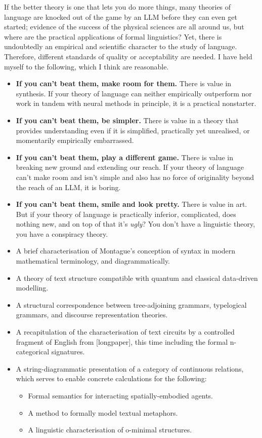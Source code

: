 If the better theory is one that lets you do more things, many theories of language are knocked out of the game by an LLM before they can even get started; evidence of the success of the physical sciences are all around us, but where are the practical applications of formal linguistics? Yet, there is undoubtedly an empirical and scientific character to the study of language. Therefore, different standards of quality or acceptability are needed. I have held myself to the following, which I think are reasonable.

\begin{itemize}
\item{\textbf{If you can't beat them, make room for them.} There is value in synthesis. If your theory of language can neither empirically outperform nor work in tandem with neural methods in principle, it is a practical nonstarter.}
\item{\textbf{If you can't beat them, be simpler.} There is value in a theory that provides understanding even if it is simplified, practically yet unrealised, or momentarily empirically embarrassed.}
\item{\textbf{If you can't beat them, play a different game.} There is value in breaking new ground and extending our reach. If your theory of language can't make room and isn't simple and also has no force of originality beyond the reach of an LLM, it is boring.}
\item{\textbf{If you can't beat them, smile and look pretty.} There is value in art. But if your theory of language is practically inferior, complicated, does nothing new, and on top of that it's \emph{ugly}? You don't have a linguistic theory, you have a conspiracy theory.}
\end{itemize}

\begin{itemize}
\item{A brief characterisation of Montague's conception of syntax in modern mathematical terminology, and diagrammatically.}
\item{A theory of text structure compatible with quantum and classical data-driven modelling.}
\item{A structural correspondence between tree-adjoining grammars, typelogical grammars, and discourse representation theories.}
\item{A recapitulation of the characterisation of text circuits by a controlled fragment of English from [longpaper], this time including the formal n-categorical signatures.}
\item{A string-diagrammatic presentation of a category of continuous relations, which serves to enable concrete calculations for the following:
\begin{itemize}
\item{Formal semantics for interacting spatially-embodied agents.}
\item{A method to formally model textual metaphors.}
\item{A linguistic characterisation of o-minimal structures.}
\end{itemize}
}
\end{itemize}